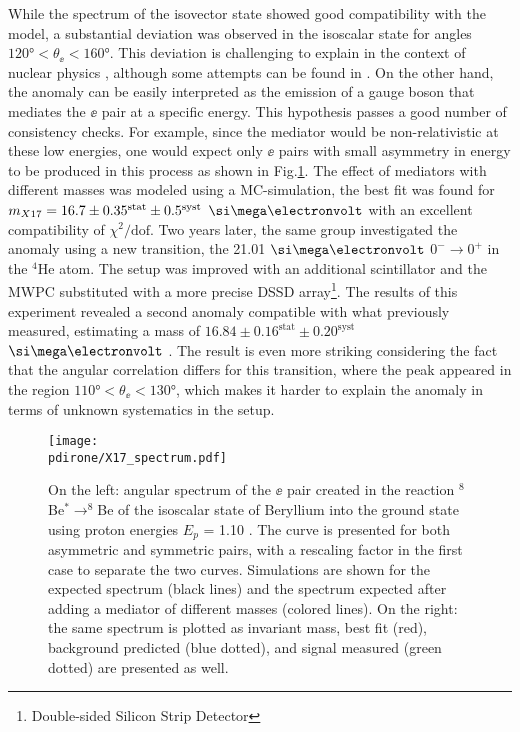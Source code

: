 While the spectrum of the isovector state showed good compatibility with the model, a substantial deviation was observed in the isoscalar state for angles $120 \si{\degree} < \theta_{\ee} < 160 \si{\degree}$. This deviation is challenging to explain in the context of nuclear physics \cite{Krasznahorkay:2015iga}, although some attempts can be found in \cite{Zhang:2017zap,Koch:2020ouk}. On the other hand, the anomaly can be easily interpreted as the emission of a gauge boson that mediates the $\ee$ pair at a specific energy. This hypothesis passes a good number of consistency checks. For example, since the mediator would be non-relativistic at these low energies, one would expect only $\ee$ pairs with small asymmetry in energy to be produced in this process as shown in Fig.\ref{fig:be-anomaly}. The effect of mediators with different masses was modeled using a MC-simulation, the best fit was found for $m_{X17} = 16.7 \pm 0.35^{\textrm{stat}} \pm 0.5^{\textrm{syst}}$ $\mev$ with an excellent compatibility of $\chi^2/\textrm{dof}$. Two years later, the same group investigated the anomaly using a new transition, the 21.01 $\mev$ $0^- \to 0^+$ in the $^4$He atom. The setup was improved with an additional scintillator and the MWPC substituted with a more precise  DSSD array\footnote{Double-sided Silicon Strip Detector}. The results of this experiment revealed a second anomaly compatible with what previously measured, estimating a mass of $16.84 \pm 0.16^{\textrm{stat}} \pm 0.20^{\textrm{syst}}$ $\mev$ \cite{Krasznahorkay:2019lyl}. The result is even more striking considering the fact that the angular correlation differs for this transition, where the peak appeared in the region $110 \si{\degree} < \theta_{\ee} < 130 \si{\degree}$, which makes it harder to explain the anomaly in terms of unknown systematics in the setup.

\begin{figure}[htb!]
  \centering
  \texttt{[image: \\pdirone/X17\_spectrum.pdf]}
  \caption[$^8$Be anomaly]{On the left: angular spectrum of the $\ee$ pair created in the reaction $^8$Be$^* \to ^8$Be of the isoscalar state of Beryllium into the ground state using proton energies $E_p$ = 1.10 \mev. The curve is presented for both asymmetric and symmetric pairs, with a rescaling factor in the first case to separate the two curves. Simulations are shown for the expected spectrum (black lines) and the spectrum expected after adding a mediator of different masses (colored lines). On the right: the same spectrum is plotted as invariant mass, best fit (red), background predicted (blue dotted), and signal measured (green dotted) are presented as well. \cite{Krasznahorkay:2015iga}}
  \label{fig:be-anomaly}
\end{figure}

